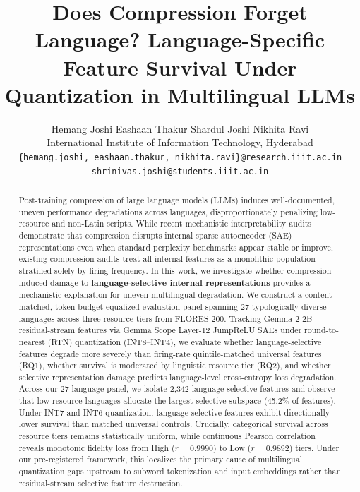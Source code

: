 \documentclass[11pt]{article}
\title{Does Compression Forget Language? Language-Specific Feature Survival Under Quantization in Multilingual LLMs}
\author{
  Hemang Joshi \quad Eashaan Thakur \quad Shardul Joshi \quad Nikhita Ravi \\
  International Institute of Information Technology, Hyderabad \\
  \texttt{\{hemang.joshi, eashaan.thakur, nikhita.ravi\}@research.iiit.ac.in} \\
  \texttt{shrinivas.joshi@students.iiit.ac.in}
}
\begin{document}
\maketitle

\begin{abstract}
Post-training compression of large language models (LLMs) induces well-documented, uneven performance degradations across languages, disproportionately penalizing low-resource and non-Latin scripts. While recent mechanistic interpretability audits demonstrate that compression disrupts internal sparse autoencoder (SAE) representations even when standard perplexity benchmarks appear stable or improve, existing compression audits treat all internal features as a monolithic population stratified solely by firing frequency. In this work, we investigate whether compression-induced damage to \textbf{language-selective internal representations} provides a mechanistic explanation for uneven multilingual degradation. We construct a content-matched, token-budget-equalized evaluation panel spanning 27 typologically diverse languages across three resource tiers from FLORES-200. Tracking Gemma-2-2B residual-stream features via Gemma Scope Layer-12 JumpReLU SAEs under round-to-nearest (RTN) quantization (INT8--INT4), we evaluate whether language-selective features degrade more severely than firing-rate quintile-matched universal features (RQ1), whether survival is moderated by linguistic resource tier (RQ2), and whether selective representation damage predicts language-level cross-entropy loss degradation. Across our 27-language panel, we isolate 2,342 language-selective features and observe that low-resource languages allocate the largest selective subspace (45.2\% of features). Under INT7 and INT6 quantization, language-selective features exhibit directionally lower survival than matched universal controls. Crucially, categorical survival across resource tiers remains statistically uniform, while continuous Pearson correlation reveals monotonic fidelity loss from High ($r=0.9990$) to Low ($r=0.9892$) tiers. Under our pre-registered framework, this localizes the primary cause of multilingual quantization gaps upstream to subword tokenization and input embeddings rather than residual-stream selective feature destruction.
\end{abstract}
\end{document}
